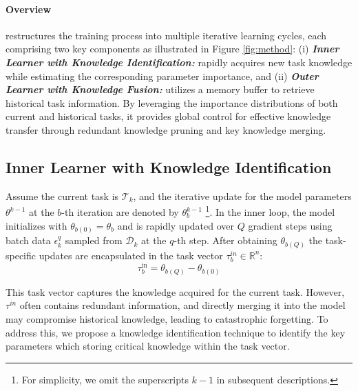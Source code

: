 

\paragraph{Overview}
{\ouralg} restructures the training process into multiple iterative learning cycles, each comprising two key components as illustrated in Figure \ref{fig:method}:
(i) \textit{\textbf{Inner Learner with Knowledge Identification:}} rapidly acquires new task knowledge while estimating the corresponding parameter importance, and
(ii) \textit{\textbf{Outer Learner with Knowledge Fusion:}} utilizes a memory buffer to retrieve historical task information. 
By leveraging the importance distributions of both current and historical tasks, it provides global control for effective knowledge transfer through redundant knowledge pruning and key knowledge merging.





\subsection{Inner Learner with Knowledge Identification}  
Assume the current task is \(\mathcal{T}_k\), and the iterative update for the model parameters $\theta^{k-1}$ at the $b$-th iteration are denoted by $\theta_b^{k-1}$ \footnote{For simplicity, we omit the superscripts $k-1$ in subsequent descriptions.}.
In the inner loop, the model initializes with $\theta_{b(0)} = \theta_b$ and is rapidly updated over \(Q\) gradient steps using batch data $\epsilon_{k}^q$ sampled from \(\mathcal{D}_k\) at the $q$-th step. 
After obtaining $\theta_{b(Q)}$ the task-specific updates are encapsulated in the task vector $\tau_b^{in} \in \mathbb{R}^n$:
\begin{equation}
\tau_b^{\text{in}} = \theta_{b(Q)} - \theta_{b(0)}
\end{equation}

This task vector captures the knowledge acquired for the current task. However, $\tau^{in}$ often contains redundant information, and directly merging it into the model may compromise historical knowledge, leading to catastrophic forgetting.
To address this, we propose a knowledge identification technique to identify the key parameters which storing critical knowledge within the task vector.

